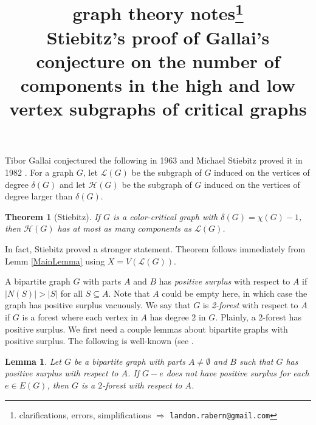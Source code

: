 \documentclass[12pt]{article}
\title{graph theory notes\thanks{clarifications, errors, simplifications $\Rightarrow$ \texttt{landon.rabern@gmail.com}}\\ \bigskip
Stiebitz's proof of Gallai's conjecture on the number of components in the high and low vertex subgraphs of critical graphs}
\date{}
\theoremstyle{plain}
\newtheorem{lem}[thm]{Lemma}
\newtheorem*{Theorem}{Theorem}
\theoremstyle{definition}
\theoremstyle{remark}
\newcommand{\fancy}[1]{\mathcal{#1}}
\renewcommand{\L}{\fancy{L}}
\def\L{\fancy{L}}
\def\H{\fancy{H}}
\begin{document}
\maketitle

Tibor Gallai conjectured the following in 1963 \cite{gallai1963kritische, gallai1963kritische2} and Michael Stiebitz proved it in 1982 \cite{stiebitz1982proof}.  For a graph $G$,
let $\L(G)$ be the subgraph of $G$ induced on the vertices of degree $\delta(G)$ and let $\H(G)$ be the subgraph of $G$ induced on the vertices of degree larger than $\delta(G)$.

\begin{Theorem}[Stiebitz]
If $G$ is a color-critical graph with $\delta(G) = \chi(G) - 1$, then $\H(G)$ has at most as many components as $\L(G)$.
\end{Theorem}

In fact, Stiebitz proved a stronger statement.  Theorem follows immediately from Lemm \ref{MainLemma} using $X = V(\L(G))$.  


A bipartite graph $G$ with parts $A$ and $B$ has \emph{positive surplus} with respect to $A$ if $|N(S)| > |S|$ for all $S \subseteq A$.  Note that $A$ could be empty here, in which case the graph has positive surplus vacuously. We say that $G$ is \emph{2-forest} with respect to $A$ if $G$ is a forest where each vertex in $A$ has degree $2$ in $G$.  Plainly, a $2$-forest has positive surplus.  We first need a couple lemmas about bipartite graphs with positive surplus.  The following is well-known (see \cite{LovaszPlummer)}.

\begin{lem}\label{PositiveSurplusIsTwoForest}
Let $G$ be a bipartite graph with parts $A \ne \emptyset$ and $B$ such that $G$ has positive surplus with respect to $A$.  If $G-e$ does not have positive surplus for each $e \in E(G)$, then $G$ is a $2$-forest with respect to $A$.
\end{lem}
\end{document}
